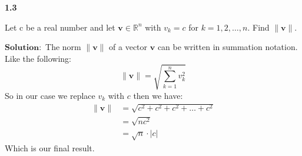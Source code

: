 \documentclass[12pt]{article}
\begin{document}
    
    \textbf{1.3} \\  %
    \begin{prop}
        Let c be a real number and let $\mathbf{v} \in \mathbb{R}^n$ with $v_k = c$ for $k = 1,2, \dots ,n.$ Find $\|\mathbf{v}\|$.
    \end{prop}
    
        
            $\textbf{Solution}:$ The norm $\|\mathbf{v}\|$ of a vector $\mathbf{v}$ can be written in summation notation. Like the following:
            \[
                \|  \mathbf{v} \| = \sqrt{\sum_{k=1}^{n}v_k^2}
            \]
            So in our case we replace $v_k$ with $c$ then we have:
            \begin{align*}
                \|  \mathbf{v} \|& = \sqrt{c^2 + c^2 + c^2 + \dots +c^2}\\
                & = \sqrt{nc^2}\\
                & = \sqrt{n} \cdot \lvert c\rvert
            \end{align*}
            Which is our final result.
\end{document}
